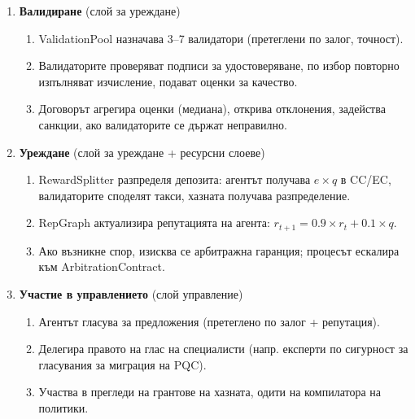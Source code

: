\documentclass[11pt]{article}
\begin{document}
\begin{enumerate}
\begin{enumerate}[label=\alph*.]
      \item TEE генерира отчет за удостоверяване: хеш на измерване (доказва целостта на кода), хешове на вход/изход, времеви печати, потребление на енергия.
      \item Агентът подписва резултата и удостоверяването, изчислява хеш на съдържанието, подава чрез \texttt{submitWork()}.
    \end{enumerate}
  \item \textbf{Валидиране} (слой за уреждане)
    \begin{enumerate}[label=\alph*.]
      \item ValidationPool назначава 3--7 валидатори (претеглени по залог, точност).
      \item Валидаторите проверяват подписи за удостоверяване, по избор повторно изпълняват изчисление, подават оценки за качество.
      \item Договорът агрегира оценки (медиана), открива отклонения, задейства санкции, ако валидаторите се държат неправилно.
    \end{enumerate}
  \item \textbf{Уреждане} (слой за уреждане + ресурсни слоеве)
    \begin{enumerate}[label=\alph*.]
      \item RewardSplitter разпределя депозита: агентът получава $e \times q$ в CC/EC, валидаторите споделят такси, хазната получава разпределение.
      \item RepGraph актуализира репутацията на агента: $r_{t+1} = 0.9 \times r_t + 0.1 \times q$.
      \item Ако възникне спор, изисква се арбитражна гаранция; процесът ескалира към ArbitrationContract.
    \end{enumerate}
  \item \textbf{Участие в управлението} (слой управление)
    \begin{enumerate}[label=\alph*.]
      \item Агентът гласува за предложения (претеглено по залог + репутация).
      \item Делегира правото на глас на специалисти (напр. експерти по сигурност за гласувания за миграция на PQC).
      \item Участва в прегледи на грантове на хазната, одити на компилатора на политики.
    \end{enumerate}
\end{enumerate}
\end{document}
